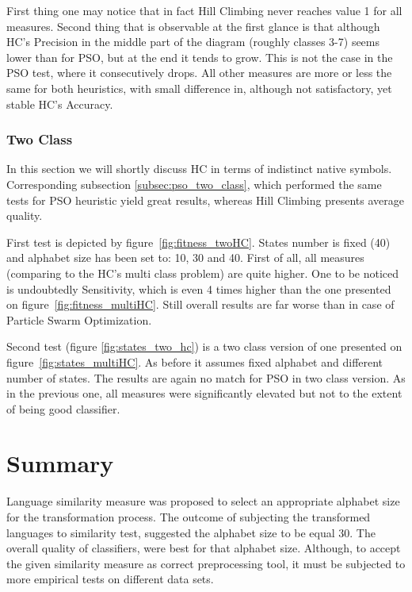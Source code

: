 \documentclass{mini}
\begin{document}
First thing one may notice that in fact Hill Climbing never reaches value 1 for all measures. Second thing that is observable at the first glance is that although HC's Precision in the middle part of the diagram (roughly classes 3-7) seems lower than for PSO, but at the end it tends to grow. This is not the case in the PSO test, where it consecutively drops. All other measures are more or less the same for both heuristics, with small difference in, although not satisfactory, yet stable HC's Accuracy.

\makeFigureHCClasses


\subsubsection{Two Class} \label{subsec:two_class_hc}
In this section we will shortly discuss HC in terms of indistinct native symbols. Corresponding subsection \ref{subsec:pso_two_class}, which performed the same tests for PSO heuristic yield great results, whereas Hill Climbing presents average quality.

First test is depicted by figure~\ref{fig:fitness_twoHC}. States number is fixed (40) and alphabet size has been set to: 10, 30 and 40. First of all, all measures (comparing to the HC's multi class problem) are quite higher. One to be noticed is undoubtedly Sensitivity, which is even 4 times higher than the one presented on figure~\ref{fig:fitness_multiHC}. Still overall results are far worse than in case of Particle Swarm Optimization.

\makeFigureIndistinctHC

Second test (figure \ref{fig:states_two_hc}) is a two class version of one presented on figure~\ref{fig:states_multiHC}. As before it assumes fixed alphabet and different number of states. The results are again no match for PSO in two class version. As in the previous one, all measures were significantly elevated but not to the extent of being good classifier.
\makeFigureStatesTwoHC

\section{Summary}

Language similarity measure was proposed to select an appropriate alphabet size for the transformation process. The outcome of subjecting the transformed languages to similarity test, suggested the alphabet size to be equal $30$. The overall quality of classifiers, were best for that alphabet size. Although, to accept the given similarity measure as correct preprocessing tool, it must be subjected to more empirical tests on different data sets.
\end{document}
